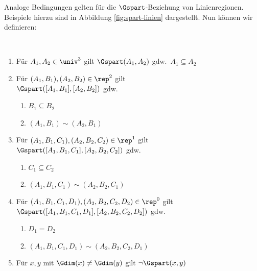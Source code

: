         Analoge Bedingungen gelten für die $\Gspart$-Beziehung von Linienregionen. Beispiele hierzu sind in Abbildung \ref{fig:spart-linien} dargestellt.
        Nun können wir definieren:
%
        \begin{dfn}\ \vspace{0pt}

            \begin{enumerate}
                \item Für $A_1, A_2 \in \univ^3$ gilt $\Gspart(A_1,A_2)$ gdw.\ $A_1 \subseteq A_2$
                \item Für $(A_1,B_1), (A_2,B_2) \in \rep^2$ gilt \\
                $\Gspart([A_1,B_1],[A_2,B_2])$ gdw.\ 
                    \begin{enumerate}
                        \item $B_1 \subseteq B_2$
                        \item $(A_1, B_1) \sim (A_2, B_1)$
                    \end{enumerate}	
                \item Für $(A_1,B_1,C_1), (A_2,B_2,C_2) \in \rep^1$ gilt \\
                $\Gspart([A_1,B_1,C_1],[A_2,B_2,C_2])$ gdw.\ 
                    \begin{enumerate}
                        \item $C_1 \subseteq C_2$
                        \item $(A_1, B_1, C_1) \sim (A_2, B_2, C_1)$
                    \end{enumerate}	
                \item Für $(A_1,B_1,C_1,D_1), (A_2,B_2,C_2,D_2) \in \rep^0$ gilt \\
                $\Gspart([A_1,B_1,C_1,D_1],[A_2,B_2,C_2,D_2])$ gdw.\
                    \begin{enumerate}
                        \item $D_1 = D_2$
                        \item $(A_1, B_1, C_1, D_1) \sim (A_2, B_2, C_2, D_1)$
                    \end{enumerate}	
                \item Für $x, y$ mit $\Gdim(x) \neq \Gdim(y)$ gilt $\neg \Gspart(x,y)$
            \end{enumerate}
            
        \end{dfn}
